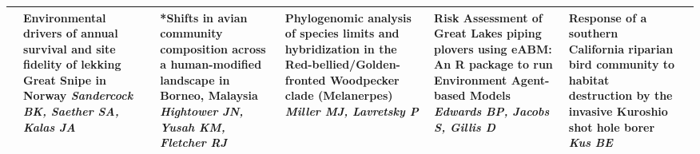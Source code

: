 \begin{tabular}{|x{0.75cm}|a{2.25cm}|x{2.25cm}|a{2.25cm}|x{2.25cm}|x{2.25cm}|a{2.25cm}|}
\hline
{}&Environmental drivers of annual survival and site fidelity of lekking Great Snipe in Norway \newline \newline \textit{Sandercock BK, Saether SA, Kalas JA} & *Shifts in avian community composition across a human-modified landscape in Borneo, Malaysia \newline \newline \textit{Hightower JN, Yusah KM, Fletcher RJ} & Phylogenomic analysis of species limits and hybridization in the Red-bellied/Golden-fronted Woodpecker clade (Melanerpes) \newline \newline \textit{Miller MJ, Lavretsky P} & Risk Assessment of Great Lakes piping plovers using eABM: An R package to run Environment Agent-based Models \newline \newline \textit{Edwards BP, Jacobs S, Gillis D} & Response of a southern California riparian bird community to habitat destruction by the invasive Kuroshio shot hole borer \newline \newline \textit{Kus BE} &  \newline \newline \textit{}\\
\hline
\end{tabular}
